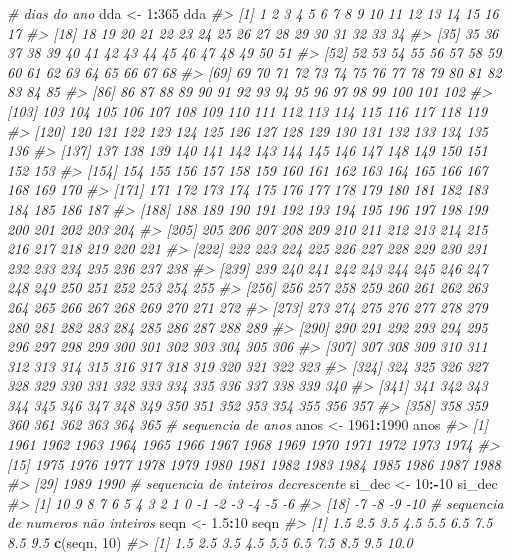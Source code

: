 \documentclass[]{book}
\newenvironment{Shaded}{\begin{snugshade}}{\end{snugshade}}
\newcommand{\KeywordTok}[1]{\textcolor[rgb]{0.13,0.29,0.53}{\textbf{#1}}}
\newcommand{\DecValTok}[1]{\textcolor[rgb]{0.00,0.00,0.81}{#1}}
\newcommand{\FloatTok}[1]{\textcolor[rgb]{0.00,0.00,0.81}{#1}}
\newcommand{\StringTok}[1]{\textcolor[rgb]{0.31,0.60,0.02}{#1}}
\newcommand{\CommentTok}[1]{\textcolor[rgb]{0.56,0.35,0.01}{\textit{#1}}}
\newcommand{\OperatorTok}[1]{\textcolor[rgb]{0.81,0.36,0.00}{\textbf{#1}}}
\newcommand{\NormalTok}[1]{#1}
\begin{document}
\begin{Shaded}
\begin{Highlighting}[]
\CommentTok{# dias do ano}
\NormalTok{dda <-}\StringTok{ }\DecValTok{1}\OperatorTok{:}\DecValTok{365}
\NormalTok{dda}
\CommentTok{#>   [1]   1   2   3   4   5   6   7   8   9  10  11  12  13  14  15  16  17}
\CommentTok{#>  [18]  18  19  20  21  22  23  24  25  26  27  28  29  30  31  32  33  34}
\CommentTok{#>  [35]  35  36  37  38  39  40  41  42  43  44  45  46  47  48  49  50  51}
\CommentTok{#>  [52]  52  53  54  55  56  57  58  59  60  61  62  63  64  65  66  67  68}
\CommentTok{#>  [69]  69  70  71  72  73  74  75  76  77  78  79  80  81  82  83  84  85}
\CommentTok{#>  [86]  86  87  88  89  90  91  92  93  94  95  96  97  98  99 100 101 102}
\CommentTok{#> [103] 103 104 105 106 107 108 109 110 111 112 113 114 115 116 117 118 119}
\CommentTok{#> [120] 120 121 122 123 124 125 126 127 128 129 130 131 132 133 134 135 136}
\CommentTok{#> [137] 137 138 139 140 141 142 143 144 145 146 147 148 149 150 151 152 153}
\CommentTok{#> [154] 154 155 156 157 158 159 160 161 162 163 164 165 166 167 168 169 170}
\CommentTok{#> [171] 171 172 173 174 175 176 177 178 179 180 181 182 183 184 185 186 187}
\CommentTok{#> [188] 188 189 190 191 192 193 194 195 196 197 198 199 200 201 202 203 204}
\CommentTok{#> [205] 205 206 207 208 209 210 211 212 213 214 215 216 217 218 219 220 221}
\CommentTok{#> [222] 222 223 224 225 226 227 228 229 230 231 232 233 234 235 236 237 238}
\CommentTok{#> [239] 239 240 241 242 243 244 245 246 247 248 249 250 251 252 253 254 255}
\CommentTok{#> [256] 256 257 258 259 260 261 262 263 264 265 266 267 268 269 270 271 272}
\CommentTok{#> [273] 273 274 275 276 277 278 279 280 281 282 283 284 285 286 287 288 289}
\CommentTok{#> [290] 290 291 292 293 294 295 296 297 298 299 300 301 302 303 304 305 306}
\CommentTok{#> [307] 307 308 309 310 311 312 313 314 315 316 317 318 319 320 321 322 323}
\CommentTok{#> [324] 324 325 326 327 328 329 330 331 332 333 334 335 336 337 338 339 340}
\CommentTok{#> [341] 341 342 343 344 345 346 347 348 349 350 351 352 353 354 355 356 357}
\CommentTok{#> [358] 358 359 360 361 362 363 364 365}
\CommentTok{# sequencia de anos}
\NormalTok{anos <-}\StringTok{ }\DecValTok{1961}\OperatorTok{:}\DecValTok{1990}
\NormalTok{anos}
\CommentTok{#>  [1] 1961 1962 1963 1964 1965 1966 1967 1968 1969 1970 1971 1972 1973 1974}
\CommentTok{#> [15] 1975 1976 1977 1978 1979 1980 1981 1982 1983 1984 1985 1986 1987 1988}
\CommentTok{#> [29] 1989 1990}
\CommentTok{# sequencia de inteiros decrescente}
\NormalTok{si_dec <-}\StringTok{ }\DecValTok{10}\OperatorTok{:-}\DecValTok{10}
\NormalTok{si_dec}
\CommentTok{#>  [1]  10   9   8   7   6   5   4   3   2   1   0  -1  -2  -3  -4  -5  -6}
\CommentTok{#> [18]  -7  -8  -9 -10}
\CommentTok{# sequencia de numeros não inteiros}
\NormalTok{seqn <-}\StringTok{ }\FloatTok{1.5}\OperatorTok{:}\DecValTok{10}
\NormalTok{seqn}
\CommentTok{#> [1] 1.5 2.5 3.5 4.5 5.5 6.5 7.5 8.5 9.5}
\KeywordTok{c}\NormalTok{(seqn, }\DecValTok{10}\NormalTok{)}
\CommentTok{#>  [1]  1.5  2.5  3.5  4.5  5.5  6.5  7.5  8.5  9.5 10.0}
\end{Highlighting}
\end{Shaded}
\end{document}
